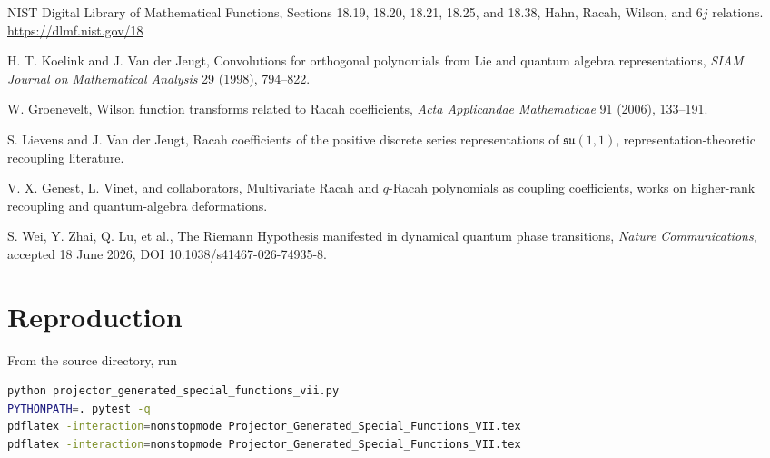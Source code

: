 \documentclass[11pt,openany]{report}
\theoremstyle{definition}
\theoremstyle{remark}
\begin{document}
\begin{thebibliography}{10}

NIST Digital Library of Mathematical Functions,
Sections 18.19, 18.20, 18.21, 18.25, and 18.38,
Hahn, Racah, Wilson, and $6j$ relations.
\url{https://dlmf.nist.gov/18}

H. T. Koelink and J. Van der Jeugt,
Convolutions for orthogonal polynomials from Lie and quantum algebra representations,
\emph{SIAM Journal on Mathematical Analysis} 29 (1998), 794--822.

W. Groenevelt,
Wilson function transforms related to Racah coefficients,
\emph{Acta Applicandae Mathematicae} 91 (2006), 133--191.

S. Lievens and J. Van der Jeugt,
Racah coefficients of the positive discrete series representations of $\mathfrak{su}(1,1)$,
representation-theoretic recoupling literature.

V. X. Genest, L. Vinet, and collaborators,
Multivariate Racah and $q$-Racah polynomials as coupling coefficients,
works on higher-rank recoupling and quantum-algebra deformations.

S. Wei, Y. Zhai, Q. Lu, et al.,
The Riemann Hypothesis manifested in dynamical quantum phase transitions,
\emph{Nature Communications}, accepted 18 June 2026,
DOI 10.1038/s41467-026-74935-8.

\end{thebibliography}

\chapter{Reproduction}

From the source directory, run
\begin{lstlisting}[language=bash,numbers=none]
python projector_generated_special_functions_vii.py
PYTHONPATH=. pytest -q
pdflatex -interaction=nonstopmode Projector_Generated_Special_Functions_VII.tex
pdflatex -interaction=nonstopmode Projector_Generated_Special_Functions_VII.tex
\end{lstlisting}
\end{document}
